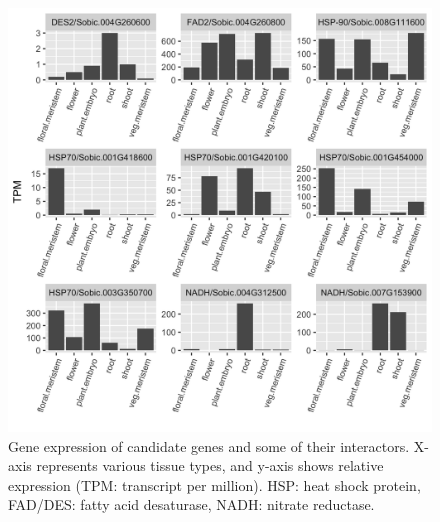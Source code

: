 \documentclass[10pt,letterpaper]{article}
\begin{document}
\begin{figure}
    \includegraphics[width=\textwidth]{Figure6}
    \caption{Gene expression of candidate genes and some of their interactors. X-axis represents various tissue types, and y-axis shows relative expression (TPM: transcript per million). HSP: heat shock protein, FAD/DES: fatty acid desaturase, NADH: nitrate reductase.}
    \label{fig6}
\end{figure}

\end{document}
